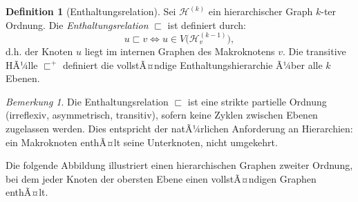 ﻿\documentclass[12pt,a4paper,twoside]{article}
\theoremstyle{definition}
\newtheorem{definition}{Definition}[section]
\theoremstyle{plain}
\theoremstyle{remark}
\newtheorem{bemerkung}{Bemerkung}[section]
\begin{document}
\begin{definition}[Enthaltungsrelation]
	\label{def:enthalten}
	Sei $\mathcal{H}^{(k)}$ ein hierarchischer Graph $k$-ter Ordnung.
	Die \emph{Enthaltungsrelation} $\sqsubset$ ist definiert durch:
	\[
	u \sqsubset v \iff u \in V\!\bigl(\mathcal{H}^{(k-1)}_v\bigr),
	\]
	d.h. der Knoten $u$ liegt im internen Graphen des Makroknotens $v$.
	Die transitive HÃ¼lle $\sqsubset^{+}$ definiert die vollstÃ¤ndige
	Enthaltungshierarchie Ã¼ber alle $k$ Ebenen.
\end{definition}

\begin{bemerkung}
	Die Enthaltungsrelation $\sqsubset$ ist eine strikte partielle Ordnung
	(irreflexiv, asymmetrisch, transitiv), sofern keine Zyklen zwischen
	Ebenen zugelassen werden.  Dies entspricht der natÃ¼rlichen Anforderung
	an Hierarchien: ein Makroknoten enthÃ¤lt seine Unterknoten, nicht
	umgekehrt.
\end{bemerkung}

Die folgende Abbildung illustriert einen hierarchischen Graphen zweiter
Ordnung, bei dem jeder Knoten der obersten Ebene einen vollstÃ¤ndigen
Graphen enthÃ¤lt.
\end{document}
